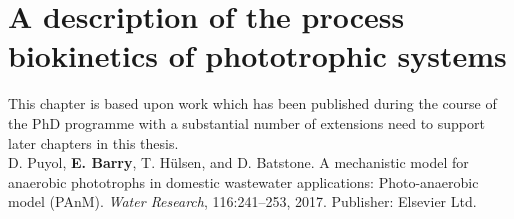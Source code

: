 \chapter[Process biokinetics of phototrophic systems]{A description of the process biokinetics of phototrophic systems}
\label{Chap:chap2}	%
\pagestyle{headings}

This chapter is based upon work which has been published during the course of the PhD programme with a substantial number of extensions need to support later chapters in this thesis.\\

D. Puyol, \textbf{E. Barry}, T. H\"{u}lsen, and D. Batstone. A mechanistic model for anaerobic phototrophs
in domestic wastewater applications: Photo-anaerobic model (PAnM).
\textit{Water Research}, 116:241–253, 2017. Publisher: Elsevier Ltd.

